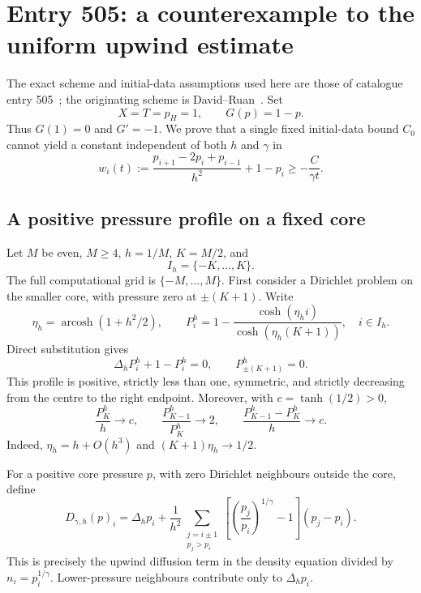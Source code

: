 \documentclass[11pt,a4paper]{article}
\theoremstyle{remark}
\begin{document}
\tableofcontents
\newpage

\section{Entry 505: a counterexample to the uniform upwind estimate}\label{sec:ab}

The exact scheme and initial-data assumptions used here are those of catalogue entry 505~\cite{repo505}; the originating scheme is David--Ruan~\cite{davidruan}. Set
\[
 X=T=p_H=1,\qquad G(p)=1-p.
\]
Thus $G(1)=0$ and $G'=-1$. We prove that a single fixed initial-data bound $C_0$ cannot yield a constant independent of both $h$ and $\gamma$ in
\begin{equation}\label{eq:abtarget}
 w_i(t):=\frac{p_{i+1}-2p_i+p_{i-1}}{h^2}+1-p_i
 \ge -\frac{C}{\gamma t}.
\end{equation}

\subsection{A positive pressure profile on a fixed core}

Let $M$ be even, $M\ge4$, $h=1/M$, $K=M/2$, and
\[
 I_h=\{-K,\ldots,K\}.
\]
The full computational grid is $\{-M,\ldots,M\}$. First consider a Dirichlet problem on the smaller core, with pressure zero at $\pm(K+1)$. Write
\[
 \eta_h=\operatorname{arcosh}(1+h^2/2),\qquad
 P_i^h=1-\frac{\cosh(\eta_h i)}{\cosh(\eta_h(K+1))},\quad i\in I_h.
\]
Direct substitution gives
\begin{equation}\label{eq:linprofile}
 \Delta_hP_i^h+1-P_i^h=0,\qquad P^h_{\pm(K+1)}=0.
\end{equation}
This profile is positive, strictly less than one, symmetric, and strictly decreasing from the centre to the right endpoint. Moreover, with $c=\tanh(1/2)>0$,
\begin{equation}\label{eq:edgeasymp}
 \frac{P_K^h}{h}\longrightarrow c,\qquad
 \frac{P_{K-1}^h}{P_K^h}\longrightarrow2,\qquad
 \frac{P_{K-1}^h-P_K^h}{h}\longrightarrow c.
\end{equation}
Indeed, $\eta_h=h+O(h^3)$ and $(K+1)\eta_h\to1/2$.

For a positive core pressure $p$, with zero Dirichlet neighbours outside the core, define
\begin{equation}\label{eq:Dgamma}
 D_{\gamma,h}(p)_i=
 \Delta_hp_i+\frac1{h^2}\sum_{\substack{j=i\pm1\\p_j>p_i}}
 \left[\left(\frac{p_j}{p_i}\right)^{1/\gamma}-1\right](p_j-p_i).
\end{equation}
This is precisely the upwind diffusion term in the density equation divided by $n_i=p_i^{1/\gamma}$. Lower-pressure neighbours contribute only to $\Delta_hp_i$.
\end{document}
